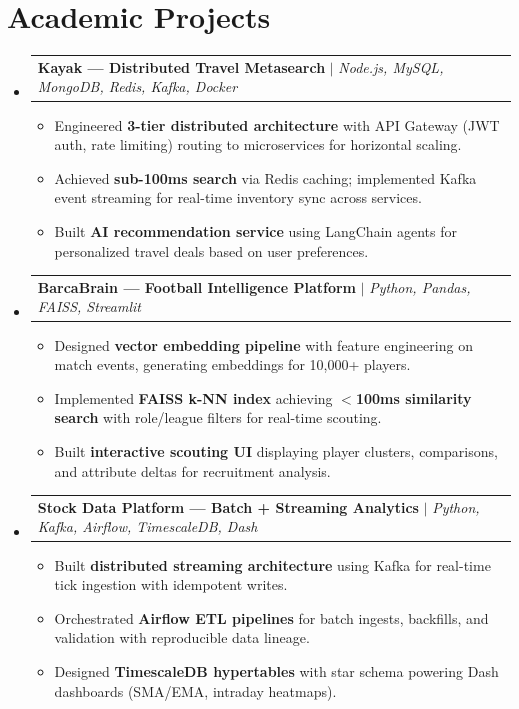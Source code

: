 \documentclass[letterpaper,10pt]{article}
\makeatletter
\newcommand{\resumeItem}[1]{
  \item\small{#1 \vspace{-3pt}}
}
\newcommand{\resumeProjectHeading}[2]{
    \item
    \begin{tabular*}{0.97\textwidth}{l@{\extracolsep{\fill}}r}
      \small#1 & #2 \\
    \end{tabular*}\vspace{-8pt}
}
\newcommand{\resumeSubHeadingListStart}{\begin{itemize}[leftmargin=0.12in, label={}]}
\newcommand{\resumeSubHeadingListEnd}{\end{itemize}}
\newcommand{\resumeItemListStart}{\begin{itemize}[leftmargin=0.15in]}
\newcommand{\resumeItemListEnd}{\end{itemize}\vspace{-6pt}}
\makeatother
\begin{document}
\section{Academic Projects}
    \resumeSubHeadingListStart
      \resumeProjectHeading
          {\textbf{Kayak --- Distributed Travel Metasearch} $|$ \emph{Node.js, MySQL, MongoDB, Redis, Kafka, Docker}}{}
          \resumeItemListStart
            \resumeItem{Engineered \textbf{3-tier distributed architecture} with API Gateway (JWT auth, rate limiting) routing to microservices for horizontal scaling.}
            \resumeItem{Achieved \textbf{sub-100ms search} via Redis caching; implemented Kafka event streaming for real-time inventory sync across services.}
            \resumeItem{Built \textbf{AI recommendation service} using LangChain agents for personalized travel deals based on user preferences.}
          \resumeItemListEnd
      \resumeProjectHeading
          {\textbf{BarcaBrain --- Football Intelligence Platform} $|$ \emph{Python, Pandas, FAISS, Streamlit}}{}
          \resumeItemListStart
            \resumeItem{Designed \textbf{vector embedding pipeline} with feature engineering on match events, generating embeddings for 10,000+ players.}
            \resumeItem{Implemented \textbf{FAISS k-NN index} achieving \textbf{$<$100ms similarity search} with role/league filters for real-time scouting.}
            \resumeItem{Built \textbf{interactive scouting UI} displaying player clusters, comparisons, and attribute deltas for recruitment analysis.}
          \resumeItemListEnd
      \resumeProjectHeading
          {\textbf{Stock Data Platform --- Batch + Streaming Analytics} $|$ \emph{Python, Kafka, Airflow, TimescaleDB, Dash}}{}
          \resumeItemListStart
            \resumeItem{Built \textbf{distributed streaming architecture} using Kafka for real-time tick ingestion with idempotent writes.}
            \resumeItem{Orchestrated \textbf{Airflow ETL pipelines} for batch ingests, backfills, and validation with reproducible data lineage.}
            \resumeItem{Designed \textbf{TimescaleDB hypertables} with star schema powering Dash dashboards (SMA/EMA, intraday heatmaps).}
          \resumeItemListEnd
    \resumeSubHeadingListEnd

\end{document}

